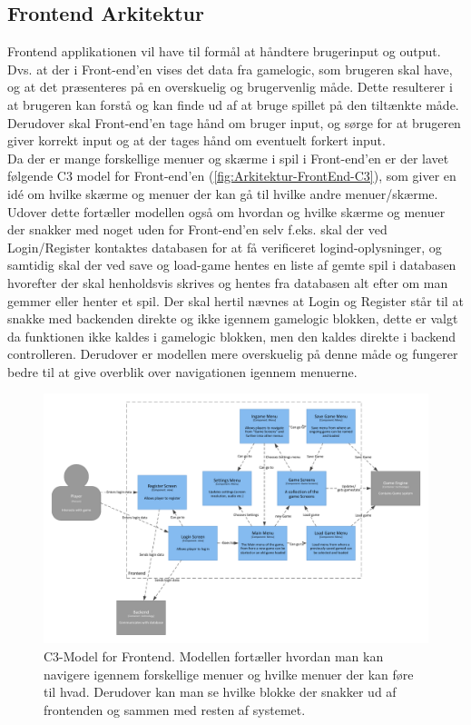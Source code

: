 \subsection{Frontend Arkitektur}

Frontend applikationen vil have til formål at håndtere brugerinput og output. Dvs. at der i Front-end'en vises det data fra gamelogic, som brugeren skal have, og at det præsenteres på en overskuelig og brugervenlig måde. Dette resulterer i at brugeren kan forstå og kan finde ud af at bruge spillet på den tiltænkte måde.
Derudover skal Front-end'en tage hånd om bruger input, og sørge for at brugeren giver korrekt input og at der tages hånd om eventuelt forkert input.\\
Da der er mange forskellige menuer og skærme i spil i Front-end'en er der lavet følgende C3 model for Front-end'en (\autoref{fig:Arkitektur-FrontEnd-C3}), som giver en idé om hvilke skærme og menuer der kan gå til hvilke andre menuer/skærme. Udover dette fortæller modellen også om hvordan og hvilke skærme og menuer der snakker med noget uden for Front-end'en selv f.eks. skal der ved Login/Register kontaktes databasen for at få verificeret logind-oplysninger, og samtidig skal der ved save og load-game hentes en liste af gemte spil i databasen hvorefter der skal henholdsvis skrives og hentes fra databasen alt efter om man gemmer eller henter et spil. Der skal hertil nævnes at Login og Register står til at snakke med backenden direkte og ikke igennem gamelogic blokken, dette er valgt da funktionen ikke kaldes i gamelogic blokken, men den kaldes direkte i backend controlleren. Derudover er modellen mere overskuelig på denne måde og fungerer bedre til at give overblik over navigationen igennem menuerne.

\begin{figure}[H]
\centering
\includegraphics[width = \textwidth]{02-Body/Images/Frontend_C3.pdf}
\caption{C3-Model for Frontend. Modellen fortæller hvordan man kan navigere igennem forskellige menuer og hvilke menuer der kan føre til hvad. Derudover kan man se hvilke blokke der snakker ud af frontenden og sammen med resten af systemet.}
\label{fig:Arkitektur-FrontEnd-C3}
\end{figure}

